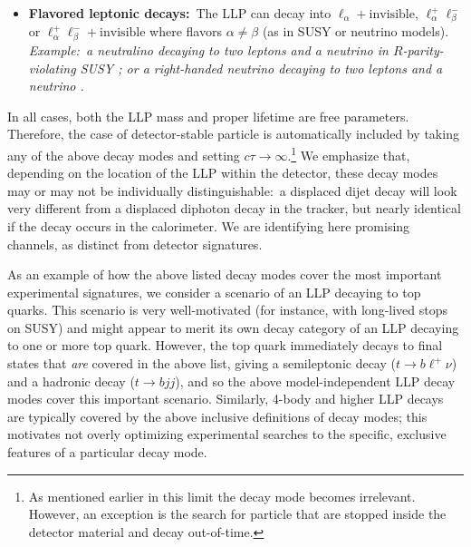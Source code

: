 \begin{itemize}
\item {\bf Flavored leptonic decays:}~The LLP can decay into
  $\ell_\alpha+\mathrm{invisible}$, $\ell_\alpha^+\ell_\beta^-$ or
  $\ell_\alpha^+\ell_\beta^-+\mathrm{invisible}$ where flavors
  $\alpha\neq\beta$ (as in SUSY or neutrino models). \emph{Example:~a neutralino decaying to two
   leptons and a neutrino in $R$-parity-violating SUSY \cite{Barbier:2004ez}; or a right-handed neutrino decaying to 
   two leptons and a neutrino \cite{delAguila:2008cj}.}
\end{itemize}

In all cases, both the LLP mass and proper lifetime are free
parameters.  Therefore, the case of detector-stable particle is automatically included by taking
any of the above decay modes and setting $c\tau\rightarrow\infty$.\footnote{As mentioned 
earlier in this limit the decay mode becomes 
irrelevant. However, an exception is the search for particle that are stopped 
inside the detector material and decay out-of-time.}
We emphasize that, depending on the location of the LLP within the
detector, these decay modes may or may not be individually
distinguishable:~a displaced dijet decay will look very different from
a displaced diphoton decay in the tracker, but nearly identical if the
decay occurs in the calorimeter.  We are identifying here promising
channels, as distinct from detector signatures. 

As an example of how the above listed decay modes cover the most important
experimental signatures, we consider a scenario of an LLP decaying to
top quarks. This scenario is very well-motivated (for instance, with
long-lived stops on SUSY) and might appear to merit its own decay
category of an LLP decaying to one or more top quark. However, the top quark immediately decays to final states
that \emph{are} covered in the above list, giving a semileptonic
decay ($t\rightarrow b\ell^+\nu$) and a hadronic decay ($t\rightarrow
bjj$), and so the above model-independent LLP decay modes cover this
important scenario. Similarly, 4-body and higher LLP decays are typically covered
by the above inclusive definitions of decay modes; this motivates not overly 
optimizing experimental searches to the specific, exclusive features of a
particular decay mode.

